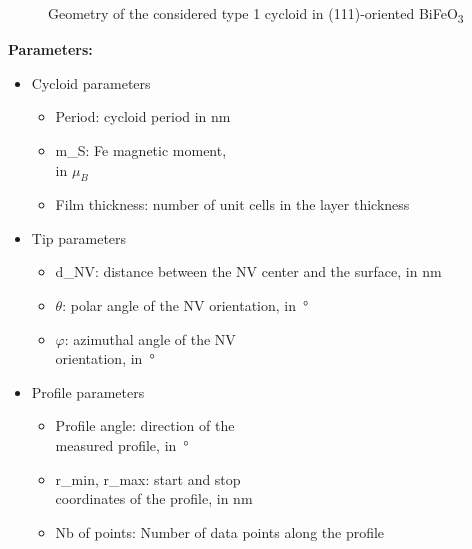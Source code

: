 \documentclass[a4paper,12pt]{article}
\newcommand{\BFO}{BiFeO\textsubscript{3}\ }
\begin{document}
\begin{figure}
  \caption{Geometry of the considered type 1 cycloid in (111)-oriented \BFO}
\end{figure}

\textbf{Parameters:}
\begin{itemize}
\item Cycloid parameters
  \begin{itemize}
  \item Period: cycloid period in \si{\nano\meter}
  \item m\_S: Fe magnetic moment,\\ in $\mu_B$
  \item Film thickness: number of unit cells in the layer thickness
  \end{itemize}
\item Tip parameters
  \begin{itemize}
  \item d\_NV: distance between the NV center and the surface, in \si{\nano\meter}
  \item $\theta$: polar angle of the NV orientation, in~°
  \item $\varphi$: azimuthal angle of the NV\\ orientation, in~°
  \end{itemize}
\item Profile parameters
  \begin{itemize}
  \item Profile angle: direction of the\\ measured profile, in~°
  \item r\_min, r\_max: start and stop \\coordinates of the profile, in \si{\nano\meter}
  \item Nb of points: Number of data points along the profile
  \end{itemize}
\end{itemize}
\end{document}
